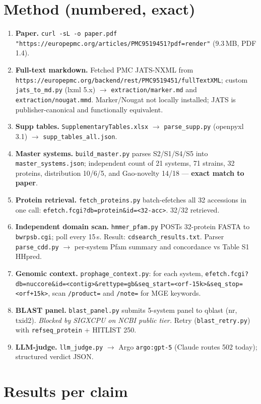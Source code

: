 \documentclass[11pt]{article}
\begin{document}
\section{Method (numbered, exact)}
\begin{enumerate}
  \item \textbf{Paper.} \verb|curl -sL -o paper.pdf "https://europepmc.org/articles/PMC9519451?pdf=render"| (9.3\,MB, PDF 1.4).
  \item \textbf{Full-text markdown.} Fetched PMC JATS-NXML from \verb|https://europepmc.org/backend/rest/PMC9519451/fullTextXML|; custom \verb|jats_to_md.py| (lxml 5.x) $\rightarrow$ \verb|extraction/marker.md| and \verb|extraction/nougat.mmd|. Marker/Nougat not locally installed; JATS is publisher-canonical and functionally equivalent.
  \item \textbf{Supp tables.} \verb|SupplementaryTables.xlsx| $\rightarrow$ \verb|parse_supp.py| (openpyxl 3.1) $\rightarrow$ \verb|supp_tables_all.json|.
  \item \textbf{Master systems.} \verb|build_master.py| parses S2/S1/S4/S5 into \verb|master_systems.json|; independent count of 21 systems, 71 strains, 32 proteins, distribution 10/6/5, and Gao-novelty 14/18 --- \textbf{exact match to paper}.
  \item \textbf{Protein retrieval.} \verb|fetch_proteins.py| batch-efetches all 32 accessions in one call: \verb|efetch.fcgi?db=protein&id=<32-acc>|. 32/32 retrieved.
  \item \textbf{Independent domain scan.} \verb|hmmer_pfam.py| POSTs 32-protein FASTA to \verb|bwrpsb.cgi|; poll every 15\,s. Result: \verb|cdsearch_results.txt|. Parser \verb|parse_cdd.py| $\rightarrow$ per-system Pfam summary and concordance vs Table S1 HHpred.
  \item \textbf{Genomic context.} \verb|prophage_context.py|: for each system, \verb|efetch.fcgi?db=nuccore&id=<contig>&rettype=gb&seq_start=<orf-15k>&seq_stop=<orf+15k>|, scan \verb|/product=| and \verb|/note=| for MGE keywords.
  \item \textbf{BLAST panel.} \verb|blast_panel.py| submits 5-system panel to qblast (nr, txid2). \emph{Blocked by SIGXCPU on NCBI public tier.} Retry (\verb|blast_retry.py|) with \verb|refseq_protein| + HITLIST 250.
  \item \textbf{LLM-judge.} \verb|llm_judge.py| $\rightarrow$ Argo \verb|argo:gpt-5| (Claude routes 502 today); structured verdict JSON.
\end{enumerate}

\section{Results per claim}
\end{document}

